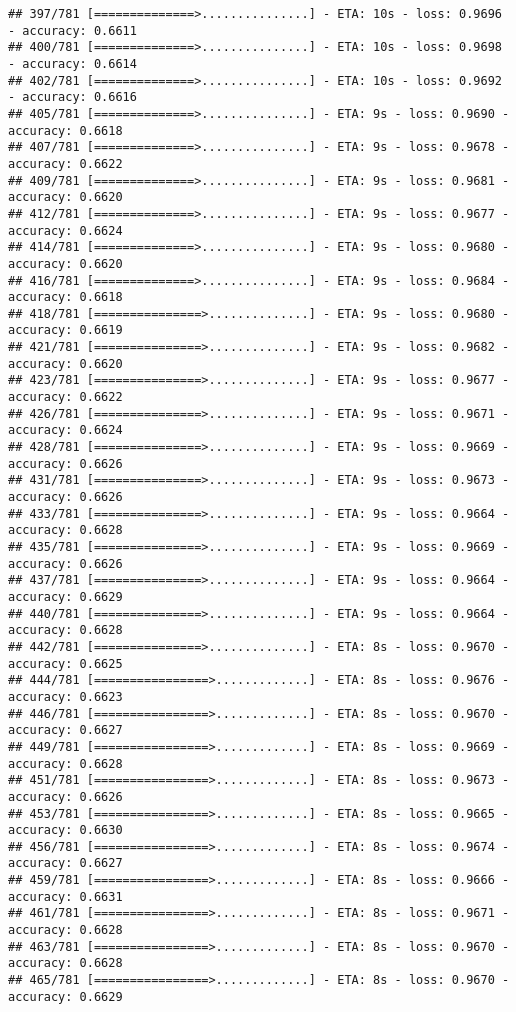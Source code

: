 \documentclass[
]{article}
\begin{document}
\begin{verbatim}
## 397/781 [==============>...............] - ETA: 10s - loss: 0.9696 - accuracy: 0.6611
## 400/781 [==============>...............] - ETA: 10s - loss: 0.9698 - accuracy: 0.6614
## 402/781 [==============>...............] - ETA: 10s - loss: 0.9692 - accuracy: 0.6616
## 405/781 [==============>...............] - ETA: 9s - loss: 0.9690 - accuracy: 0.6618 
## 407/781 [==============>...............] - ETA: 9s - loss: 0.9678 - accuracy: 0.6622
## 409/781 [==============>...............] - ETA: 9s - loss: 0.9681 - accuracy: 0.6620
## 412/781 [==============>...............] - ETA: 9s - loss: 0.9677 - accuracy: 0.6624
## 414/781 [==============>...............] - ETA: 9s - loss: 0.9680 - accuracy: 0.6620
## 416/781 [==============>...............] - ETA: 9s - loss: 0.9684 - accuracy: 0.6618
## 418/781 [===============>..............] - ETA: 9s - loss: 0.9680 - accuracy: 0.6619
## 421/781 [===============>..............] - ETA: 9s - loss: 0.9682 - accuracy: 0.6620
## 423/781 [===============>..............] - ETA: 9s - loss: 0.9677 - accuracy: 0.6622
## 426/781 [===============>..............] - ETA: 9s - loss: 0.9671 - accuracy: 0.6624
## 428/781 [===============>..............] - ETA: 9s - loss: 0.9669 - accuracy: 0.6626
## 431/781 [===============>..............] - ETA: 9s - loss: 0.9673 - accuracy: 0.6626
## 433/781 [===============>..............] - ETA: 9s - loss: 0.9664 - accuracy: 0.6628
## 435/781 [===============>..............] - ETA: 9s - loss: 0.9669 - accuracy: 0.6626
## 437/781 [===============>..............] - ETA: 9s - loss: 0.9664 - accuracy: 0.6629
## 440/781 [===============>..............] - ETA: 9s - loss: 0.9664 - accuracy: 0.6628
## 442/781 [===============>..............] - ETA: 8s - loss: 0.9670 - accuracy: 0.6625
## 444/781 [================>.............] - ETA: 8s - loss: 0.9676 - accuracy: 0.6623
## 446/781 [================>.............] - ETA: 8s - loss: 0.9670 - accuracy: 0.6627
## 449/781 [================>.............] - ETA: 8s - loss: 0.9669 - accuracy: 0.6628
## 451/781 [================>.............] - ETA: 8s - loss: 0.9673 - accuracy: 0.6626
## 453/781 [================>.............] - ETA: 8s - loss: 0.9665 - accuracy: 0.6630
## 456/781 [================>.............] - ETA: 8s - loss: 0.9674 - accuracy: 0.6627
## 459/781 [================>.............] - ETA: 8s - loss: 0.9666 - accuracy: 0.6631
## 461/781 [================>.............] - ETA: 8s - loss: 0.9671 - accuracy: 0.6628
## 463/781 [================>.............] - ETA: 8s - loss: 0.9670 - accuracy: 0.6628
## 465/781 [================>.............] - ETA: 8s - loss: 0.9670 - accuracy: 0.6629

\end{verbatim}
\end{document}
